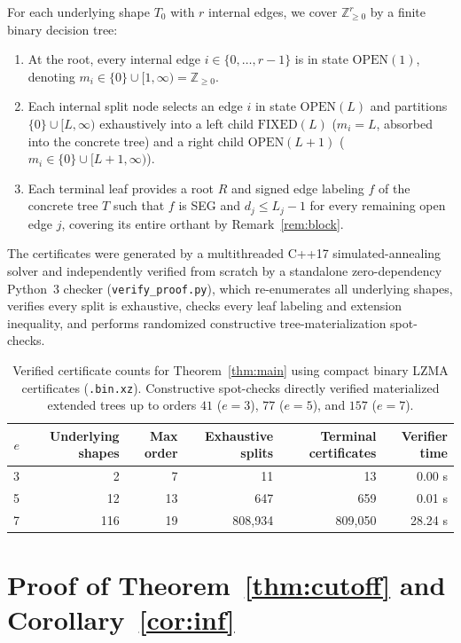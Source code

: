 \documentclass[11pt]{article}
\theoremstyle{definition}
\begin{document}
For each underlying shape $T_0$ with $r$ internal edges, we cover $\mathbb{Z}_{\ge 0}^r$ by a finite binary decision tree:
\begin{enumerate}
\item At the root, every internal edge $i \in \{0, \dots, r-1\}$ is in state $\mathrm{OPEN}(1)$, denoting $m_i \in \{0\} \cup [1, \infty) = \mathbb{Z}_{\ge 0}$.
\item Each internal split node selects an edge $i$ in state $\mathrm{OPEN}(L)$ and partitions $\{0\} \cup [L, \infty)$ exhaustively into a left child $\mathrm{FIXED}(L)$ ($m_i = L$, absorbed into the concrete tree) and a right child $\mathrm{OPEN}(L+1)$ ($m_i \in \{0\} \cup [L+1, \infty)$).
\item Each terminal leaf provides a root $R$ and signed edge labeling $f$ of the concrete tree $T$ such that $f$ is SEG and $d_j \le L_j - 1$ for every remaining open edge $j$, covering its entire orthant by Remark~\ref{rem:block}.
\end{enumerate}

The certificates were generated by a multithreaded C++17 simulated-annealing solver and independently verified from scratch by a standalone zero-dependency Python~3 checker (\texttt{verify\_proof.py}), which re-enumerates all underlying shapes, verifies every split is exhaustive, checks every leaf labeling and extension inequality, and performs randomized constructive tree-materialization spot-checks.

\begin{table}[h]
\centering
\begin{tabular}{rrrrrr}
\toprule
$e$ & Underlying shapes & Max order & Exhaustive splits & Terminal certificates & Verifier time \\
\midrule
3 & 2 & 7 & 11 & 13 & 0.00 s \\
5 & 12 & 13 & 647 & 659 & 0.01 s \\
7 & 116 & 19 & 808,934 & 809,050 & 28.24 s \\
\bottomrule
\end{tabular}
\caption{Verified certificate counts for Theorem~\ref{thm:main} using compact binary LZMA certificates (\texttt{.bin.xz}). Constructive spot-checks directly verified materialized extended trees up to orders $41$ ($e=3$), $77$ ($e=5$), and $157$ ($e=7$).}
\end{table}

\section{Proof of Theorem~\ref{thm:cutoff} and Corollary~\ref{cor:inf}}
\end{document}

